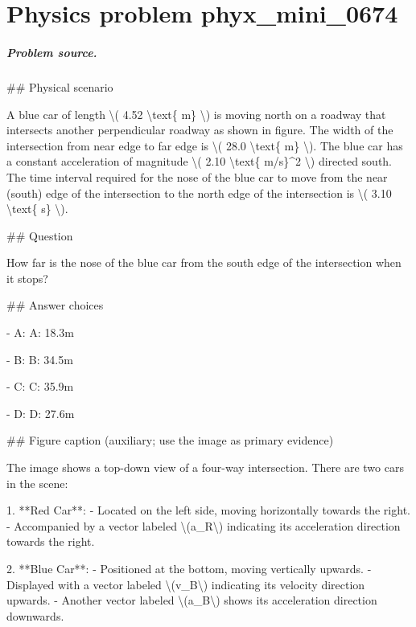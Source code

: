 
\chapter{Physics problem phyx\_mini\_0674}
\label{ch:PhyXMiniProblems_problem_phyx_mini_0674}

\paragraph{Problem source.}
\#\# Physical scenario

A blue car of length \textbackslash{}( 4.52 \textbackslash{}text\{ m\} \textbackslash{}) is moving north on a roadway that intersects another perpendicular roadway as shown in figure. The width of the intersection from near edge to far edge is \textbackslash{}( 28.0 \textbackslash{}text\{ m\} \textbackslash{}). The blue car has a constant acceleration of magnitude \textbackslash{}( 2.10 \textbackslash{}text\{ m/s\}\textasciicircum{}2 \textbackslash{}) directed south. The time interval required for the nose of the blue car to move from the near (south) edge of the intersection to the north edge of the intersection is \textbackslash{}( 3.10 \textbackslash{}text\{ s\} \textbackslash{}).

\#\# Question

How far is the nose of the blue car from the south edge of the intersection when it stops?

\#\# Answer choices

- A: A: 18.3m

- B: B: 34.5m

- C: C: 35.9m

- D: D: 27.6m

\#\# Figure caption (auxiliary; use the image as primary evidence)

The image shows a top-down view of a four-way intersection. There are two cars in the scene:

1. **Red Car**: 
   - Located on the left side, moving horizontally towards the right.
   - Accompanied by a vector labeled \textbackslash{}(a\_R\textbackslash{}) indicating its acceleration direction towards the right.

2. **Blue Car**: 
   - Positioned at the bottom, moving vertically upwards.
   - Displayed with a vector labeled \textbackslash{}(v\_B\textbackslash{}) indicating its velocity direction upwards.
   - Another vector labeled \textbackslash{}(a\_B\textbackslash{}) shows its acceleration direction downwards.

